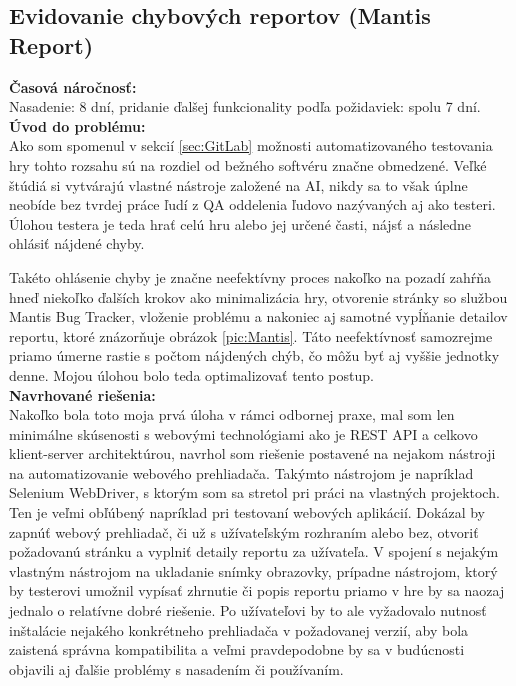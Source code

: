\documentclass[slovak, bachelorpractice]{diploma}
\begin{document}
\subsection{Evidovanie chybových reportov (Mantis Report)}
\label{sec:Report}
\textbf{Časová náročnosť:} \\ Nasadenie: 8 dní, pridanie ďalšej funkcionality podľa požidaviek: spolu 7 dní.\\
\textbf{Úvod do problému:} \\ Ako som spomenul v sekcií \ref{sec:GitLab} možnosti automatizovaného testovania hry tohto rozsahu sú na rozdiel od bežného softvéru značne obmedzené. Veľké štúdiá si vytvárajú vlastné nástroje založené na AI, nikdy sa to však úplne neobíde bez tvrdej práce ľudí z QA oddelenia ľudovo nazývaných aj ako testeri. Úlohou testera je teda hrať celú hru alebo jej určené časti, nájsť a následne ohlásiť nájdené chyby. 

Takéto ohlásenie chyby je značne neefektívny proces nakoľko na pozadí zahŕňa hneď niekoľko ďalších krokov ako minimalizácia hry, otvorenie stránky so službou Mantis Bug Tracker, vloženie problému a nakoniec aj samotné vypĺňanie detailov reportu, ktoré znázorňuje obrázok \ref{pic:Mantis}.
Táto neefektívnosť samozrejme priamo úmerne rastie s počtom nájdených chýb, čo môžu byť aj vyššie jednotky denne. Mojou úlohou bolo teda optimalizovať tento postup. \\
\textbf{Navrhované riešenia:} \\ Nakoľko bola toto moja prvá úloha v rámci odbornej praxe, mal som len minimálne skúsenosti s webovými technológiami ako je REST API a celkovo klient-server architektúrou, navrhol som riešenie postavené na nejakom nástroji na automatizovanie webového prehliadača. Takýmto nástrojom je napríklad Selenium WebDriver, s ktorým som sa stretol pri práci na vlastných projektoch. Ten je veľmi obľúbený napríklad pri testovaní webových aplikácií. Dokázal by zapnúť webový prehliadač, či už s užívateľským rozhraním alebo bez, otvoriť požadovanú stránku a vyplniť detaily reportu za užívateľa. V spojení s nejakým vlastným nástrojom na ukladanie snímky obrazovky, prípadne nástrojom, ktorý by testerovi umožnil vypísať zhrnutie či popis reportu priamo v hre by sa naozaj jednalo o relatívne dobré riešenie. Po užívateľovi by to ale vyžadovalo nutnosť inštalácie nejakého konkrétneho prehliadača v požadovanej verzií, aby bola zaistená správna kompatibilita a veľmi pravdepodobne by sa v budúcnosti objavili aj ďalšie problémy s nasadením či používaním. 
\end{document}
